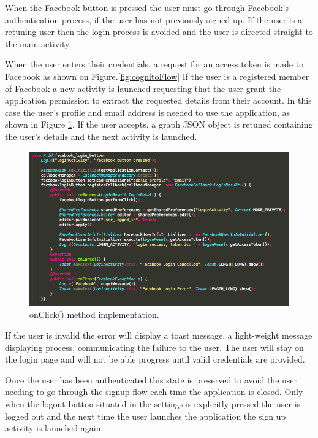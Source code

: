\documentclass[a4paper, 11pt]{article}
\begin{document}
When the Facebook button is pressed the  user must go through Facebook's authentication process, if the user has not previously signed up. If the user is a retuning user then the login process is avoided and the user is directed straight to the main activity.  

When the user enters their credentials, a request for an access token is made to Facebook as shown on Figure.\ref{fig:cognitoFlow} If the user is a registered member of Facebook a new activity is launched requesting that the user grant the application permission to extract the requested details from their account. In this case the user's profile and email address is needed to use the application, as shown in Figure \ref{fig:onClick}. If the user accepts, a graph JSON object is retuned containing the user's details and the next activity is launched.

\vspace{\baselineskip}

\begin{figure}[h]
\centering
\includegraphics[width=\textwidth]{fbProfileEmail}
\caption{onClick() method implementation.} \label{fig:onClick}
\end{figure}

\vspace{\baselineskip}


If the user is invalid the error will display a toast message, a light-weight message displaying process, communicating the failure to the user. The user will stay on the login page and will not be able progress until valid credentials are provided. 

Once the user has been authenticated this state is preserved to avoid the user needing to go through the signup flow each time the application is closed. Only when the logout button situated in the settings is explicitly pressed the user is logged out and the next time the user launches the application the sign up activity is launched again. 
\end{document}
